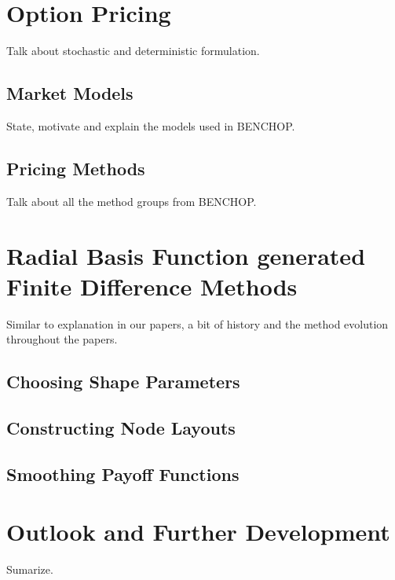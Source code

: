 \documentclass{UUThesisTemplate}
\begin{document}
\chapter{Option Pricing}
\label{ch:optionpricing}
Talk about stochastic and deterministic formulation.
\section{Market Models}
\label{sec:models}
State, motivate and explain the models used in BENCHOP.
\section{Pricing Methods}
\label{sec:methods}
Talk about all the method groups from BENCHOP.
%
%
\chapter{Radial Basis Function generated Finite Difference Methods}
\label{ch:rbffd}
Similar to explanation in our papers, a bit of history and the method evolution throughout the papers.
\section{Choosing Shape Parameters}
\section{Constructing Node Layouts}
\section{Smoothing Payoff Functions}
%
%
\chapter{Outlook and Further Development}
\label{ch:outlook}
Sumarize.

\backmatter
    
    
\end{document}

